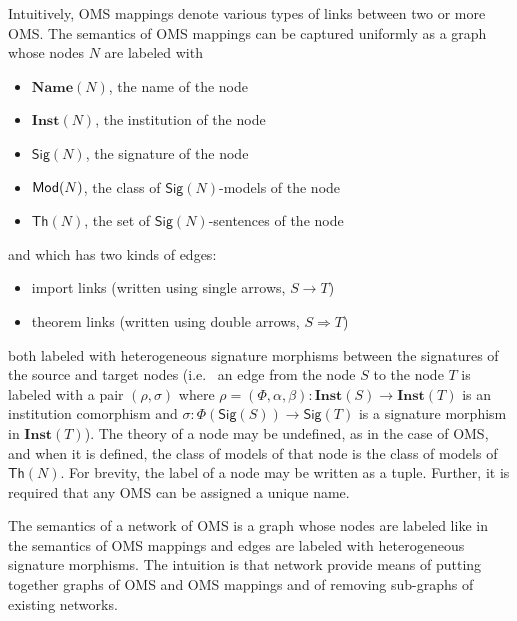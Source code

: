 \documentclass[10pt, a4paper]{isov2}
\newcommand{\Sig}{\mathsf{Sig}}
\renewcommand{\Th}{\mathsf{Th}}
\newcommand{\Inst}{\ensuremath{\mathbf{Inst}}}
\newcommand{\Name}{\ensuremath{\mathbf{Name}}}
\begin{document}
Intuitively, OMS mappings denote various types of links between two or more OMS. 
The semantics of OMS mappings can be captured uniformly as a graph whose nodes $N$ are labeled with 
\begin{itemize}
 \item $\Name(N)$, the name of the node
 \item $\Inst(N)$, the institution of the node
 \item $\Sig(N)$, the signature of the node
 \item $\mathsf{Mod}(N)$, the class of $\Sig(N)$-models of the node
 \item $\Th(N)$, the set of $\Sig(N)$-sentences of the node
\end{itemize}
and 
which has two kinds of edges:
\begin{itemize}
  \item import links (written using single arrows, $S\rightarrow T$)
  \item theorem links (written using double arrows, $S\Rightarrow T$)
\end{itemize}
both labeled with 
heterogeneous signature morphisms between the signatures of the source and target nodes
(i.e.~ 
an edge from the node $S$ to the node $T$ is labeled with a pair 
$(\rho, \sigma)$ where $\rho=(\Phi,\alpha,\beta):\Inst(S)\to\Inst(T)$ is an institution comorphism and
$\sigma:\Phi(\Sig(S))\to\Sig(T)$ is a signature morphism in $\Inst(T)$).
The theory of a node  may be undefined, as in the case of OMS, and when it is defined, 
the class of models of that node is the class of models of $\Th(N)$. 
For brevity,  the label of a node may be written as a tuple. Further, it is required that  any OMS can be assigned a unique name. 

The semantics of a network of OMS is a graph
whose nodes are labeled like in the semantics of OMS mappings and 
edges are labeled with heterogeneous signature morphisms. 
The intuition is that
network provide means of putting together graphs of OMS and OMS mappings
and of removing sub-graphs of existing networks. 
\end{document}
